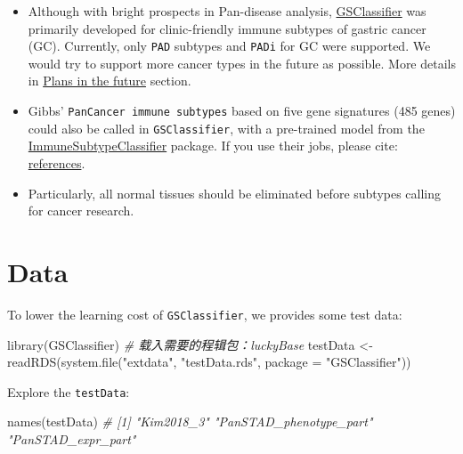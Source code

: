 \documentclass[
  12pt,
]{book}
\newenvironment{Shaded}{\begin{snugshade}}{\end{snugshade}}
\newcommand{\AttributeTok}[1]{\textcolor[rgb]{0.77,0.63,0.00}{#1}}
\newcommand{\CommentTok}[1]{\textcolor[rgb]{0.56,0.35,0.01}{\textit{#1}}}
\newcommand{\FunctionTok}[1]{\textcolor[rgb]{0.00,0.00,0.00}{#1}}
\newcommand{\NormalTok}[1]{#1}
\newcommand{\OtherTok}[1]{\textcolor[rgb]{0.56,0.35,0.01}{#1}}
\newcommand{\StringTok}[1]{\textcolor[rgb]{0.31,0.60,0.02}{#1}}
\providecommand{\tightlist}{%
  \setlength{\itemsep}{0pt}\setlength{\parskip}{0pt}}
\begin{document}
\begin{itemize}
\tightlist
\item
  Although with bright prospects in Pan-disease analysis, \href{https://github.com/huangwb8/GSClassifier}{GSClassifier} was primarily developed for clinic-friendly immune subtypes of gastric cancer (GC). Currently, only \texttt{PAD} subtypes and \texttt{PADi} for GC were supported. We would try to support more cancer types in the future as possible. More details in \href{https://github.com/huangwb8/GSClassifier/wiki/Plans-in-the-future}{Plans in the future} section.
\item
  Gibbs' \texttt{PanCancer\ immune\ subtypes} based on five gene signatures (485 genes) could also be called in \texttt{GSClassifier}, with a pre-trained model from the \href{https://github.com/CRI-iAtlas/ImmuneSubtypeClassifier}{ImmuneSubtypeClassifier} package. If you use their jobs, please cite: \href{https://github.com/huangwb8/GSClassifier/wiki/Introduction\#Reference}{references}.
\item
  Particularly, all normal tissues should be eliminated before subtypes calling for cancer research.
\end{itemize}

\hypertarget{data}{%
\section{Data}\label{data}}

To lower the learning cost of \texttt{GSClassifier}, we provides some test data:

\begin{Shaded}
\begin{Highlighting}[]
\FunctionTok{library}\NormalTok{(GSClassifier)}
\CommentTok{\# 载入需要的程辑包：luckyBase}
\NormalTok{testData }\OtherTok{\textless{}{-}} \FunctionTok{readRDS}\NormalTok{(}\FunctionTok{system.file}\NormalTok{(}\StringTok{"extdata"}\NormalTok{, }\StringTok{"testData.rds"}\NormalTok{, }\AttributeTok{package =} \StringTok{"GSClassifier"}\NormalTok{))}
\end{Highlighting}
\end{Shaded}

Explore the \texttt{testData}:

\begin{Shaded}
\begin{Highlighting}[]
\FunctionTok{names}\NormalTok{(testData)}
\CommentTok{\# [1] "Kim2018\_3"              "PanSTAD\_phenotype\_part" "PanSTAD\_expr\_part"}
\end{Highlighting}
\end{Shaded}
\end{document}
